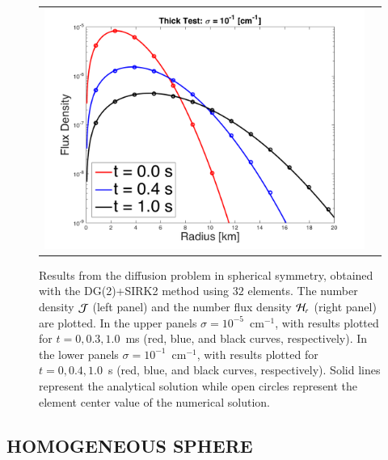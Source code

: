 \documentclass[11pt,letterpaper,twoside,english,final]{article}
\begin{document}
\begin{figure}[h]
\begin{tabular}{cc}
    \includegraphics[scale=0.38]{./Figures/GaussianSphericalDiffusion_Kappa_1e-1_Flux}
  \end{tabular}
  \vspace{-0.1in}
  \flushleft\caption[Results from the diffusion problem in spherical symmetry, obtained with the DG(2)+SIRK2 method using $32$ elements.]{Results from the diffusion problem in spherical symmetry, obtained with the DG(2)+SIRK2 method using $32$ elements.  
  \textmd{The number density $\mathcal{J}$ (left panel) and the number flux density $\mathcal{H}_{r}$ (right panel) are plotted.  In the upper panels $\sigma=10^{-5}$~cm$^{-1}$, with results plotted for $t=0,0.3,1.0$~ms (red, blue, and black curves, respectively).  In the lower panels $\sigma=10^{-1}$~cm$^{-1}$, with results plotted for $t=0,0.4,1.0$~s (red, blue, and black curves, respectively).  Solid lines represent the analytical solution while open circles represent the element center value of the numerical solution.}}
  \label{fig:diffusionProblem}
\end{figure}

\subsection{HOMOGENEOUS SPHERE}
\label{sec:homogeneousSphere}
\end{document}

